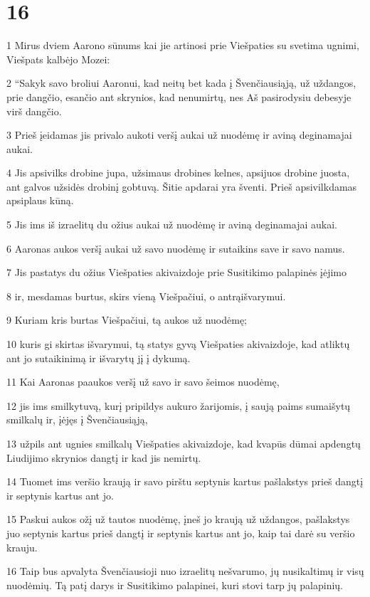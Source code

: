 \chapter{16}


\par 1 Mirus dviem Aarono sūnums kai jie artinosi prie Viešpaties su svetima ugnimi, Viešpats kalbėjo Mozei: 
\par 2 “Sakyk savo broliui Aaronui, kad neitų bet kada į Švenčiausiąją, už uždangos, prie dangčio, esančio ant skrynios, kad nenumirtų, nes Aš pasirodysiu debesyje virš dangčio. 
\par 3 Prieš įeidamas jis privalo aukoti veršį aukai už nuodėmę ir aviną deginamajai aukai. 
\par 4 Jis apsivilks drobine jupa, užsimaus drobines kelnes, apsijuos drobine juosta, ant galvos užsidės drobinį gobtuvą. Šitie apdarai yra šventi. Prieš apsivilkdamas apsiplaus kūną. 
\par 5 Jis ims iš izraelitų du ožius aukai už nuodėmę ir aviną deginamajai aukai. 
\par 6 Aaronas aukos veršį aukai už savo nuodėmę ir sutaikins save ir savo namus. 
\par 7 Jis pastatys du ožius Viešpaties akivaizdoje prie Susitikimo palapinės įėjimo 
\par 8 ir, mesdamas burtus, skirs vieną Viešpačiui, o antrą­išvarymui. 
\par 9 Kuriam kris burtas Viešpačiui, tą aukos už nuodėmę; 
\par 10 kuris gi skirtas išvarymui, tą statys gyvą Viešpaties akivaizdoje, kad atliktų ant jo sutaikinimą ir išvarytų jį į dykumą. 
\par 11 Kai Aaronas paaukos veršį už savo ir savo šeimos nuodėmę, 
\par 12 jis ims smilkytuvą, kurį pripildys aukuro žarijomis, į saują paims sumaišytų smilkalų ir, įėjęs į Švenčiausiąją, 
\par 13 užpils ant ugnies smilkalų Viešpaties akivaizdoje, kad kvapūs dūmai apdengtų Liudijimo skrynios dangtį ir kad jis nemirtų. 
\par 14 Tuomet ims veršio kraują ir savo pirštu septynis kartus pašlakstys prieš dangtį ir septynis kartus ant jo. 
\par 15 Paskui aukos ožį už tautos nuodėmę, įneš jo kraują už uždangos, pašlakstys juo septynis kartus prieš dangtį ir septynis kartus ant jo, kaip tai darė su veršio krauju. 
\par 16 Taip bus apvalyta Švenčiausioji nuo izraelitų nešvarumo, jų nusikaltimų ir visų nuodėmių. Tą patį darys ir Susitikimo palapinei, kuri stovi tarp jų palapinių. 
